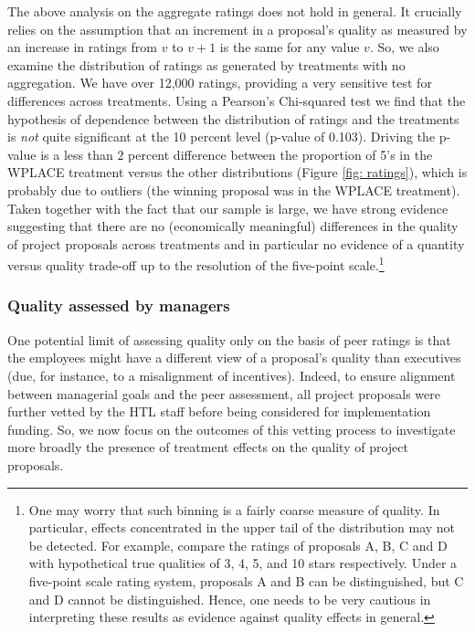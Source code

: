 \documentclass[11pt, titlepage]{article}
\begin{document}
The above analysis on the aggregate ratings does not hold in general. It
crucially relies on the assumption that an increment in a proposal's
quality as measured by an increase in ratings from \(v\) to \(v+1\) is
the same for any value \(v\). So, we also examine the distribution of
ratings as generated by treatments with no aggregation. We have over
12,000 ratings, providing a very sensitive test for differences across
treatments. Using a Pearson's Chi-squared test we find that the
hypothesis of dependence between the distribution of ratings and the
treatments is \emph{not} quite significant at the 10 percent level
(p-value of 0.103). Driving the p-value is a less than \(2\) percent
difference between the proportion of 5's in the WPLACE treatment versus
the other distributions (Figure \ref{fig: ratings}), which is probably
due to outliers (the winning proposal was in the WPLACE treatment).
Taken together with the fact that our sample is large, we have strong
evidence suggesting that there are no (economically meaningful)
differences in the quality of project proposals across treatments and in
particular no evidence of a quantity versus quality trade-off up to the
resolution of the five-point scale.\footnote{One may worry that such
  binning is a fairly coarse measure of quality. In particular, effects
  concentrated in the upper tail of the distribution may not be
  detected. For example, compare the ratings of proposals A, B, C and D
  with hypothetical true qualities of 3, 4, 5, and 10 stars
  respectively. Under a five-point scale rating system, proposals A and
  B can be distinguished, but C and D cannot be distinguished. Hence,
  one needs to be very cautious in interpreting these results as
  evidence against quality effects in general.}

\subsubsection{Quality assessed by
managers}\label{quality-assessed-by-managers}

One potential limit of assessing quality only on the basis of peer
ratings is that the employees might have a different view of a
proposal's quality than executives (due, for instance, to a misalignment
of incentives). Indeed, to ensure alignment between managerial goals and
the peer assessment, all project proposals were further vetted by the
HTL staff before being considered for implementation funding. So, we now
focus on the outcomes of this vetting process to investigate more
broadly the presence of treatment effects on the quality of project
proposals.
\end{document}
